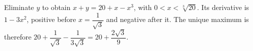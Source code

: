 Eliminate $y$ to obtain $x+y=20+x-x^3$, with $0<x<\sqrt[3]{20}$. Its derivative is $1-3x^2$, positive before $x=\dfrac{1}{\sqrt3}$ and negative after it. The unique maximum is therefore $20+\dfrac{1}{\sqrt3}-\dfrac{1}{3\sqrt3}=\boxed{20+\dfrac{2\sqrt3}{9}}$.
